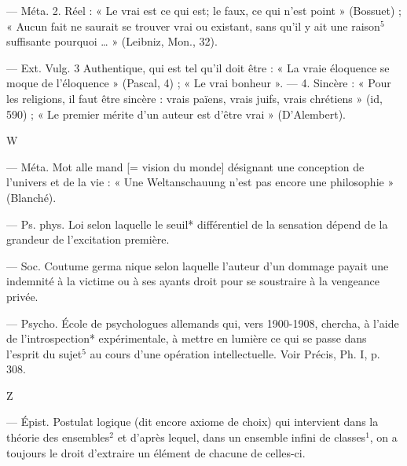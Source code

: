 \begin{itemize}[leftmargin=1cm, label=, itemsep=1pt]
— Méta. 2. Réel : « Le vrai est ce
qui est; le faux, ce qui n’est point »
(Bossuet) ; « Aucun fait ne saurait
se trouver vrai ou existant, sans
qu'il y ait une raison$^5$ suffisante
pourquoi … » (Leibniz, Mon., 32).

— Ext. Vulg. 3 Authentique,
qui est tel qu'il doit être : « La vraie
éloquence se moque de l'éloquence »
(Pascal, 4) ; « Le vrai bonheur ». —
4. Sincère : « Pour les religions, il
faut être sincère : vrais païens, vrais
juifs, vrais chrétiens » (id, 590) ;
« Le premier mérite d'un auteur est
d’être vrai » (D’Alembert).

\begin{center}
W
\end{center}

 — Méta. Mot alle
mand [= vision du monde] désignant une conception de l'univers
et de la vie : « Une Weltanschauung
n’est pas encore une philosophie »
(Blanché).

 — Ps. phys. Loi selon
laquelle le seuil* différentiel de la
sensation dépend de la grandeur de
l’excitation première.

 — Soc. Coutume germa
nique selon laquelle l’auteur d’un
dommage payait une indemnité à
la victime ou à ses ayants droit pour
se soustraire à la vengeance privée.

 — Psycho.
École de psychologues allemands
qui, vers 1900-1908, chercha, à
l’aide de l'introspection* expérimentale, à mettre en lumière ce qui
se passe dans l'esprit du sujet$^5$ au
cours d’une opération intellectuelle.
Voir Précis, Ph. I, p. 308.

\begin{center}
Z
\end{center}

 — Épist. Postulat logique (dit encore axiome de
choix) qui intervient dans la théorie
des ensembles$^2$ et d’après lequel,
dans un ensemble infini de classes$^1$,
on a toujours le droit d'extraire
un élément de chacune de celles-ci.

	\end{itemize}
